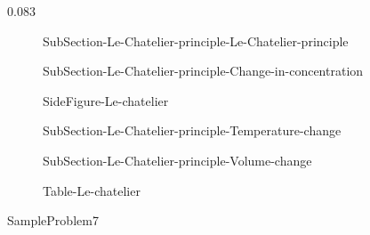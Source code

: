 0.083\documentclass[main.tex]{subfiles}
\begin{document}
\sloppy\begin{description}
\item[] {SubSection-Le-Chatelier-principle-Le-Chatelier-principle}


 \item[] {SubSection-Le-Chatelier-principle-Change-in-concentration}


 


{SideFigure-Le-chatelier}



 \item[] {SubSection-Le-Chatelier-principle-Temperature-change}



 


\newpage
  \item[] 
{SubSection-Le-Chatelier-principle-Volume-change}

   {Table-Le-chatelier}
 
\end{description}





  {SampleProblem7}
\end{document}
